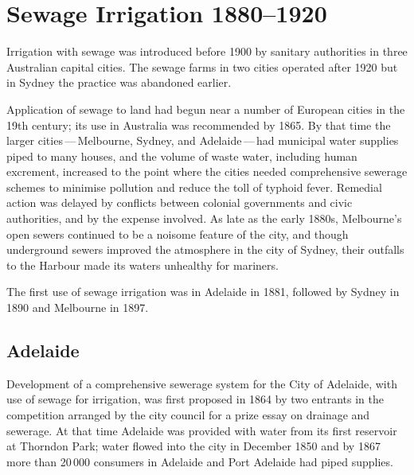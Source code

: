 
\chapter{Sewage Irrigation 1880--1920}

\label{ch:sewage}

\setcounter{endnote}{0}

Irrigation with sewage was introduced before 1900 by sanitary
authorities in three Australian capital cities.  The sewage farms in
two cities operated after 1920 but in Sydney the practice was
abandoned earlier.

Application of sewage to land had begun near a number of European
cities in the 19th century; its use in Australia was recommended by
1865.  By that time the larger cities\,---\,Melbourne, Sydney, and
Adelaide\,---\,had municipal water supplies piped to many houses, and
the volume of waste water, including human excrement, increased to the
point where the cities needed comprehensive sewerage schemes to
minimise pollution and reduce the toll of typhoid fever.  Remedial
action was delayed by conflicts between colonial governments and civic
authorities, and by the expense involved.  As late as the early 1880s,
Melbourne's open sewers continued to be a noisome feature of the city,
and though underground sewers improved the atmosphere in the city of
Sydney, their outfalls to the Harbour made its waters unhealthy for
mariners.

The first use of sewage irrigation was in Adelaide in 1881, followed
by Sydney in 1890 and Melbourne in 1897.

\section*{Adelaide}

Development of a comprehensive sewerage system for the City of
Adelaide, with use of sewage for irrigation, was first proposed in
1864 by two entrants in the competition arranged by the city council
for a prize essay on drainage and sewerage.  At that
time Adelaide was provided with water from its first
reservoir at Thorndon Park;
 water flowed into the city in December
1850 and by 1867 more than 20\,000 consumers in Adelaide and Port
Adelaide had piped supplies.

